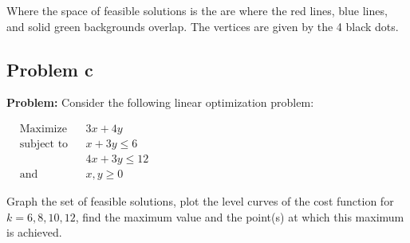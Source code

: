 \documentclass{article}
\begin{document}
Where the space of feasible solutions is the are where the red lines, blue lines, and solid green backgrounds overlap. The vertices are given by the 4 black dots.

\subsection*{Problem c}
\noindent\textbf{Problem:} Consider the following linear optimization problem:
\begin{center}
    $\begin{aligned}
        &{\text{Maximize}}
        &&3x+4y \\
        &{\text{subject to}}
        &&x+3y\le6\\
        &
        &&4x+3y\le12\\
        &{\text{and}}
        &&x,y\ge0
    \end{aligned}$
\end{center}

Graph the set of feasible solutions, plot the level curves of the cost function for $k=6,8,10,12$, find the maximum value and the point(s) at which this maximum is achieved.
\bigskip
\end{document}
